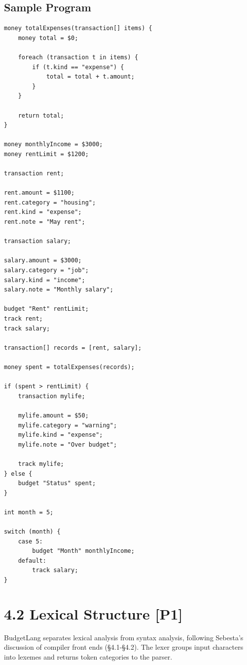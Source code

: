 \documentclass[11pt]{article}
\begin{document}
\subsection*{Sample Program}
\begin{lstlisting}
money totalExpenses(transaction[] items) {
    money total = $0;

    foreach (transaction t in items) {
        if (t.kind == "expense") {
            total = total + t.amount;
        }
    }

    return total;
}

money monthlyIncome = $3000;
money rentLimit = $1200;

transaction rent;

rent.amount = $1100;
rent.category = "housing";
rent.kind = "expense";
rent.note = "May rent";

transaction salary;

salary.amount = $3000;
salary.category = "job";
salary.kind = "income";
salary.note = "Monthly salary";

budget "Rent" rentLimit;
track rent;
track salary;

transaction[] records = [rent, salary];

money spent = totalExpenses(records);

if (spent > rentLimit) {
    transaction mylife;

    mylife.amount = $50;
    mylife.category = "warning";
    mylife.kind = "expense";
    mylife.note = "Over budget";

    track mylife;
} else {
    budget "Status" spent;
}

int month = 5;

switch (month) {
    case 5:
        budget "Month" monthlyIncome;
    default:
        track salary;
}
\end{lstlisting}

\section*{4.2 Lexical Structure [P1]}
BudgetLang separates lexical analysis from syntax analysis, following Sebesta's discussion of compiler front ends (\S4.1-\S4.2). The lexer groups input characters into lexemes and returns token categories to the parser.
\end{document}
